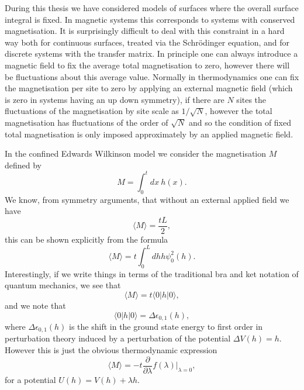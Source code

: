 During this thesis we have considered models of surfaces where the overall surface integral is fixed. In magnetic systems this corresponds to systems with conserved magnetisation. It is surprisingly difficult to deal with this constraint in a hard way both for continuous surfaces, treated via the Schr\"odinger equation, and for discrete systems with the transfer matrix. In principle one can always introduce a magnetic field to fix the average total magnetisation to zero, however there will  be fluctuations about this average value. Normally in thermodynamics one can fix the magnetisation per site to zero by applying an external magnetic field (which is zero in systems having an up down symmetry), if there are $N$ sites the fluctuations of the magnetisation by site scale as $1/\sqrt{N}$, however the total magnetisation has fluctuations of the order of $\sqrt{N}$ and so the condition of fixed  total magnetisation is only imposed approximately by an applied magnetic field.

In the confined Edwards Wilkinson model we consider the magnetisation $M$ defined
by 
\begin{equation}
M = \int_0^t dx\  h(x).
\end{equation}
We know, from symmetry arguments, that without an external applied field we have
\begin{equation}
\langle M\rangle = \frac{tL}{2},
\end{equation}
this can be shown explicitly from the formula
\begin{equation}
\langle M\rangle = t\int_0^L dh  h \psi_0^2(h) .
\end{equation}
Interestingly, if we write things in terms of the traditional bra and ket notation of quantum mechanics, we see that
\begin{equation}
\langle M\rangle = t \langle 0| h|0\rangle,
\end{equation}
and we note that 
\begin{equation}
\langle 0| h|0\rangle = \Delta \epsilon_{0,1}(h),
\end{equation}
where $\Delta \epsilon_{0,1}(h)$ is the shift in the ground state energy to first order in perturbation theory induced by a perturbation of the potential $\Delta V(h) = h$. However this is
just the obvious thermodynamic expression
\begin{equation}
\langle M\rangle = -t\frac{\partial}{\partial \lambda}f (\lambda)|_{\lambda=0},
\end{equation}
for a potential $U(h) = V(h) + \lambda  h$.

